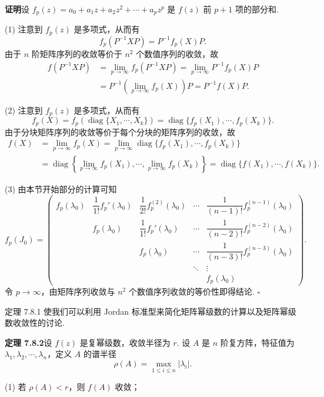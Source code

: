 \documentclass[UTF8,12pt,a4paper,fontset=fandol]{ctexart}
\begin{document}
\noindent\textbf{证明}\quad 设 $f_p(z)=a_0+a_1z+a_2z^2+\cdots+a_pz^p$ 是 $f(z)$ 前 $p+1$ 项的部分和.

(1) 注意到 $f_p(z)$ 是多项式，从而有
\[
f_p(P^{-1}XP)=P^{-1}f_p(X)P.
\]
由于 $n$ 阶矩阵序列的收敛等价于 $n^2$ 个数值序列的收敛，故
\[
\begin{aligned}
f(P^{-1}XP)&=\lim_{p\to\infty}f_p(P^{-1}XP)=\lim_{p\to\infty}P^{-1}f_p(X)P\\
&=P^{-1}\left(\lim_{p\to\infty}f_p(X)\right)P=P^{-1}f(X)P.
\end{aligned}
\]

(2) 注意到 $f_p(z)$ 是多项式，从而有
\[
f_p(X)=f_p(\operatorname{diag}\{X_1,\cdots,X_k\})=\operatorname{diag}\{f_p(X_1),\cdots,f_p(X_k)\}.
\]
由于分块矩阵序列的收敛等价于每个分块的矩阵序列的收敛，故
\[
\begin{aligned}
f(X)&=\lim_{p\to\infty}f_p(X)=\lim_{p\to\infty}\operatorname{diag}\{f_p(X_1),\cdots,f_p(X_k)\}\\
&=\operatorname{diag}\left\{\lim_{p\to\infty}f_p(X_1),\cdots,\lim_{p\to\infty}f_p(X_k)\right\}=\operatorname{diag}\{f(X_1),\cdots,f(X_k)\}.
\end{aligned}
\]

(3) 由本节开始部分的计算可知
\begin{equation}
f_p(J_0)=\left(\begin{array}{ccccc}
f_p(\lambda_0) & \dfrac1{1!}f_p'(\lambda_0) & \dfrac1{2!}f_p^{(2)}(\lambda_0) & \cdots & \dfrac1{(n-1)!}f_p^{(n-1)}(\lambda_0)\\
& f_p(\lambda_0) & \dfrac1{1!}f_p'(\lambda_0) & \cdots & \dfrac1{(n-2)!}f_p^{(n-2)}(\lambda_0)\\
& & f_p(\lambda_0) & \cdots & \dfrac1{(n-3)!}f_p^{(n-3)}(\lambda_0)\\
& & & \ddots & \vdots\\
& & & & f_p(\lambda_0)
\end{array}\right).
\tag{7.8.5}
\end{equation}
令 $p\to\infty$，由矩阵序列收敛与 $n^2$ 个数值序列收敛的等价性即得结论. $\square$

定理 7.8.1 使我们可以利用 Jordan 标准型来简化矩阵幂级数的计算以及矩阵幂级数收敛性的讨论.

\noindent\textbf{定理 7.8.2}\quad 设 $f(z)$ 是复幂级数，收敛半径为 $r$. 设 $A$ 是 $n$ 阶复方阵，特征值为 $\lambda_1,\lambda_2,\cdots,\lambda_n$，定义 $A$ 的谱半径
\[
\rho(A)=\max_{1\leq i\leq n}|\lambda_i|.
\]

(1) 若 $\rho(A)<r$，则 $f(A)$ 收敛；
\end{document}

